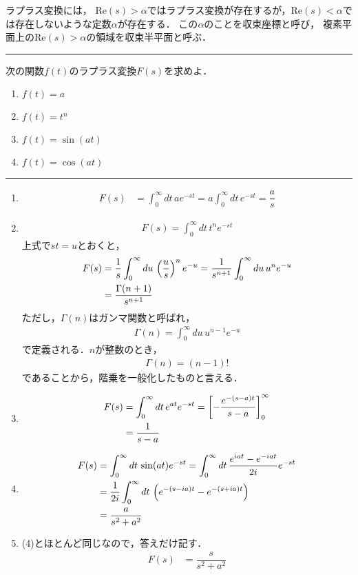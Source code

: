 ラプラス変換には，
$\mathrm{Re}(s)>\alpha$ではラプラス変換が存在するが，$\mathrm{Re}(s)<\alpha$では存在しないような定数$\alpha$が存在する．
この$\alpha$のことを収束座標と呼び，
複素平面上の$\mathrm{Re}(s)>\alpha$の領域を収束半平面と呼ぶ．
%
\newpage
%
\hrule
\reidai
次の関数$f(t)$のラプラス変換$F(s)$を求めよ．
\begin{enumerate}[(1)]
  \item $f(t)=a$
  \item $f(t)=t^n$
  \item $f(t)=\sin(at)$
  \item $f(t)=\cos(at)$ 
\end{enumerate}
\hrule
\begin{enumerate}[(1)]
\item  
\begin{align}
  F(s) & = \int_{0}^{\infty}dt\,ae^{-st} = a\int_{0}^{\infty}dt\,e^{-st}
         = \dfrac{a}{s} 
\end{align}
\item
\begin{align}
  F(s) = \int_{0}^{\infty}dt\,t^n e^{-st} 
\end{align}
上式で$st=u$とおくと，
\begin{align}
  F(s) &= \dfrac{1}{s}\int_{0}^{\infty}du\,\left(\dfrac{u}{s}\right)^{n}e^{-u}
        = \dfrac{1}{s^{n+1}}\int_{0}^{\infty}du\,u^n e^{-u} \notag \\
       &= \dfrac{\Gamma(n+1)}{s^{n+1}} 
\end{align}
ただし，$\Gamma(n)$はガンマ関数と呼ばれ，
\begin{align}
  \Gamma(n) = \int_{0}^{\infty}du\, u^{n-1}e^{-u} 
\end{align}
で定義される．$n$が整数のとき，
\begin{align}
  \Gamma(n) = (n-1)! 
\end{align}
であることから，階乗を一般化したものと言える．
\item
\begin{align}
  F(s) &= \int_{0}^{\infty}dt\,e^{at}e^{-st} = \left[ - \dfrac{e^{-(s-a)t}}{s-a} \right]_{0}^{\infty} \notag \\
       &= \dfrac{1}{s-a}
\end{align}
\item
\begin{align}
  F(s) &= \int_{0}^{\infty}dt\,\sin(at)e^{-st} = \int_{0}^{\infty}dt\,\dfrac{e^{iat}-e^{-iat}}{2i}e^{-st} \notag \\
       &= \dfrac{1}{2i}\int_{0}^{\infty}dt\,\left(e^{-(s-ia)t}-e^{-(s+ia)t}\right) \notag \\
       &= \dfrac{a}{s^{2}+a^{2}}
\end{align}
\item (4)とほとんど同じなので，答えだけ記す．
\begin{align}
  F(s) &= \dfrac{s}{s^{2}+a^{2}} 
\end{align}
\end{enumerate}
\newpage
%
